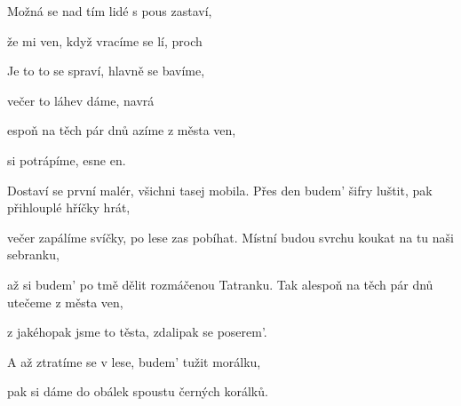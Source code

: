 

\zs

Možná  se nad tím lidé
s pous zastaví,

že mi  ven, když vracíme se
lí, proch
\ks

\zs

Je to  to se spraví,
hlavně  se bavíme,

večer  to láhev dáme,
navrá 
\ks

\zr

espoň na těch pár dnů
azíme z města ven,

 si potrápíme,
esne en.
\kr

\zs
{}

Dostaví se první malér,
všichni tasej mobila.
\ks
\zs
Přes den budem' šifry luštit,
pak přihlouplé hříčky hrát,

večer zapálíme svíčky,
po lese zas pobíhat.
\ks
\zs
Místní budou svrchu koukat
na tu naši sebranku,

až si budem' po tmě dělit
rozmáčenou Tatranku.
\ks
\zr
Tak alespoň na těch pár dnů
utečeme z města ven,

z jakéhopak jsme to těsta,
zdalipak se poserem'.
\kr

\zs
A až ztratíme se v lese,
budem' tužit morálku,

pak si dáme do obálek
spoustu černých korálků.
\ks

\kp







